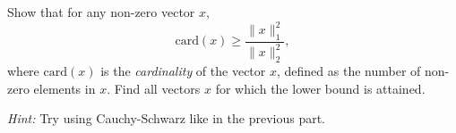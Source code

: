 \item Show that for any non-zero vector $x$,
\[
\text{card} (x) \ge \frac{\|x\|_1^2}{\|x\|_2^2},
\]
where $\text{card} (x)$ is the \emph{cardinality} of the vector $x$, defined as the number of non-zero elements in $x$. Find all vectors $x$ for which the lower bound is attained.

\textit{Hint:} Try using Cauchy-Schwarz like in the previous part.
